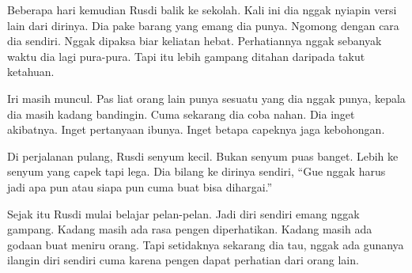 Beberapa hari kemudian Rusdi balik ke sekolah. Kali ini dia nggak nyiapin versi lain dari dirinya. Dia pake barang yang emang dia punya. Ngomong dengan cara dia sendiri. Nggak dipaksa biar keliatan hebat. Perhatiannya nggak sebanyak waktu dia lagi pura-pura. Tapi itu lebih gampang ditahan daripada takut ketahuan.


Iri masih muncul. Pas liat orang lain punya sesuatu yang dia nggak punya, kepala dia masih kadang bandingin. Cuma sekarang dia coba nahan. Dia inget akibatnya. Inget pertanyaan ibunya. Inget betapa capeknya jaga kebohongan.


Di perjalanan pulang, Rusdi senyum kecil. Bukan senyum puas banget. Lebih ke senyum yang capek tapi lega. Dia bilang ke dirinya sendiri, ``Gue nggak harus jadi apa pun atau siapa pun cuma buat bisa dihargai.''


Sejak itu Rusdi mulai belajar pelan-pelan. Jadi diri sendiri emang nggak gampang. Kadang masih ada rasa pengen diperhatikan. Kadang masih ada godaan buat meniru orang. Tapi setidaknya sekarang dia tau, nggak ada gunanya ilangin diri sendiri cuma karena pengen dapat perhatian dari orang lain.

\jedahias
